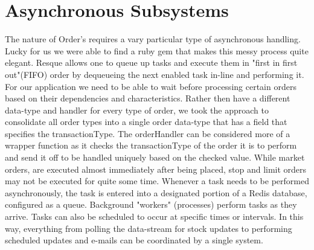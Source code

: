 \section{Asynchronous Subsystems}
The nature of Order's requires a vary particular type of asynchronous handling.  Lucky for us we were able to find a ruby gem that makes this messy process quite elegant.  Resque allows one to queue up tasks and execute them in "first in first out"(FIFO) order by dequeueing the next enabled task in-line and performing it.  For our application we need to be able to wait before processing certain orders based on their dependencies and characteristics.  Rather then have a different data-type and handler for every type of order, we took the approach to consolidate all order types into a single order data-type that has a field that specifies the transactionType.  The orderHandler can be considered more of a wrapper function as it checks the transactionType of the order it is to perform and send it off to be handled uniquely based on the checked value.  While market orders, are executed almost immediately after being placed, stop and limit orders may not be executed for quite some time.  Whenever a task needs to be performed asynchronously, the task is entered into a designated portion of a Redis database, configured as a queue. Background "workers" (processes) perform tasks as they arrive. Tasks can also be scheduled to occur at specific times or intervals. In this way, everything from polling the data-stream for stock updates to performing scheduled updates and e-mails can be coordinated by a single system.


